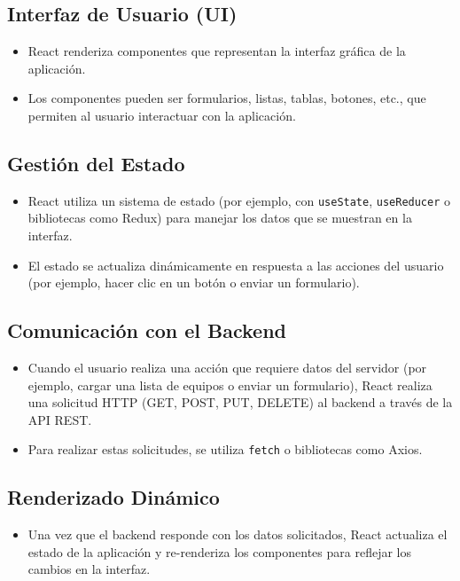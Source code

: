 \documentclass{report}
\begin{document}
    \subsection*{Interfaz de Usuario (UI)}
    \begin{itemize}
        \item React renderiza componentes que representan la interfaz gráfica de la aplicación.
        \item Los componentes pueden ser formularios, listas, tablas, botones, etc., que permiten al usuario interactuar con la aplicación.
    \end{itemize}
    
    \subsection*{Gestión del Estado}
    \begin{itemize}
        \item React utiliza un sistema de estado (por ejemplo, con \texttt{useState}, \texttt{useReducer} o bibliotecas como Redux) para manejar los datos que se muestran en la interfaz.
        \item El estado se actualiza dinámicamente en respuesta a las acciones del usuario (por ejemplo, hacer clic en un botón o enviar un formulario).
    \end{itemize}
    
    \subsection*{Comunicación con el Backend}
    \begin{itemize}
        \item Cuando el usuario realiza una acción que requiere datos del servidor (por ejemplo, cargar una lista de equipos o enviar un formulario), React realiza una solicitud HTTP (GET, POST, PUT, DELETE) al backend a través de la API REST.
        \item Para realizar estas solicitudes, se utiliza \texttt{fetch} o bibliotecas como Axios.
    \end{itemize}
    
    \subsection*{Renderizado Dinámico}
    \begin{itemize}
        \item Una vez que el backend responde con los datos solicitados, React actualiza el estado de la aplicación y re-renderiza los componentes para reflejar los cambios en la interfaz.
    \end{itemize}
    
\end{document}
